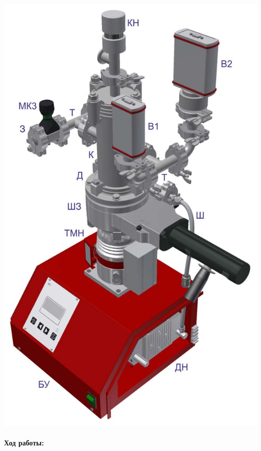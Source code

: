 \documentclass[12pt,a4paper]{article}
\begin{document}
\begin{center}
\includegraphics[scale=0.3]{ust.png}
\end{center}

\newpage

\paragraph* {Ход работы:}
\end{document}
